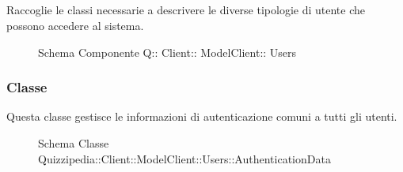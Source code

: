 \subsection{}
Raccoglie le classi necessarie a descrivere le diverse tipologie di utente che possono accedere al sistema.
\begin{figure}[H]
\centering
\noindent{}
\caption[Schema Componente Quizzipedia::Client::ModelClient::Users]{Schema Componente Q:: Client:: ModelClient:: Users}
\end{figure}
\subsubsection{Classe }
Questa classe gestisce le informazioni di autenticazione comuni a tutti gli utenti.
\begin{figure}[H]
\centering
\noindent{}
\caption[Schema Classe AuthenticationData]{Schema Classe Quizzipedia::Client::ModelClient::Users::AuthenticationData}
\end{figure}
